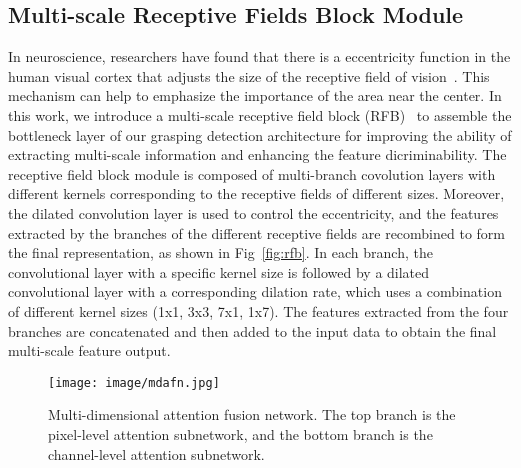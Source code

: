 \documentclass[journal]{IEEEtran}
\begin{document}
\subsection{Multi-scale Receptive Fields Block Module}
\label{sec:Multi-Scale feature map}
In neuroscience, researchers have found that there is a eccentricity function in the human visual cortex that adjusts the size of the receptive field of vision~\cite{neuroscience}. This mechanism can help to emphasize the importance of the area near the center. In this work, we introduce a multi-scale receptive field block (RFB)~\cite{rfb} to assemble the bottleneck layer of our grasping detection architecture for improving the ability of extracting multi-scale information and enhancing the feature dicriminability. The receptive field block module is composed of multi-branch covolution layers with different kernels corresponding to the receptive fields of different sizes. Moreover, the dilated convolution layer is used to control the eccentricity, and the features extracted by the branches of the different receptive fields are recombined to form the final representation, as shown in Fig~\ref{fig:rfb}. In each branch, the convolutional layer with a specific kernel size is followed by a dilated convolutional layer with a corresponding dilation rate, which uses a combination of different kernel sizes (1x1, 3x3, 7x1, 1x7). The features extracted from the four branches are concatenated and then added to the input data to obtain the final multi-scale feature output.

\begin{figure}[t!]
{\texttt{[image: image/mdafn.jpg]}}
	\caption{Multi-dimensional attention fusion network. The top branch is the pixel-level attention subnetwork, and the bottom branch is the channel-level attention subnetwork.}
	\label{fig:mdafn}
\end{figure} 
\end{document}
